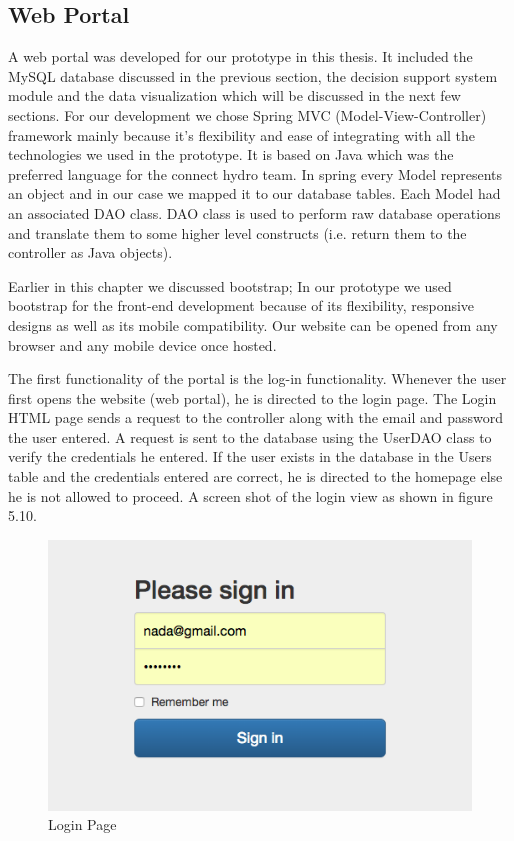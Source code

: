 \subsection{Web Portal}
A web portal was developed for our prototype in this thesis. It included the MySQL database discussed in the previous section, the decision support system module and the data visualization which will be discussed in the next few sections. For our development we chose Spring MVC (Model-View-Controller) framework mainly because it's flexibility and ease of integrating with all the technologies we used in the prototype. It is based on Java which was the preferred language for the connect hydro team. In spring every Model represents an object and in our case we mapped it to our database tables. Each Model had an associated DAO class. DAO class is used to perform raw database operations and translate them to some higher level constructs (i.e. return them to the controller as Java objects). 

Earlier in this chapter we discussed bootstrap; In our prototype we used bootstrap for the front-end development because of its flexibility, responsive designs as well as its mobile compatibility. Our website can be opened from any browser and any mobile device once hosted.

The first functionality of the portal is the log-in functionality. Whenever the user first opens the website (web portal), he is directed to the login page. The Login HTML page sends a request to the controller along with the email and password the user entered. A request is sent to the database using the UserDAO class to verify the credentials he entered. If the user exists in the database in the Users table and the credentials entered are correct, he is directed to the homepage else he is not allowed to proceed. A screen shot of the login view as shown in figure 5.10.
\begin{figure}
\centering
\includegraphics[scale=0.4]{Images/Login.png}
\caption[Login Page]{Login Page}
\end{figure}
